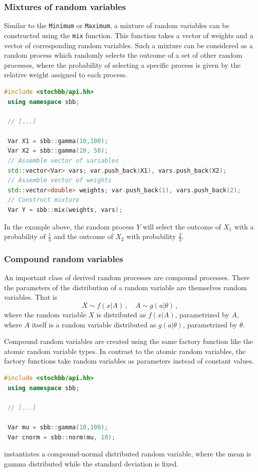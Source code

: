 \documentclass[a4paper, 10pt]{paper}
\newcommand{\code}[1]{\texttt{#1}}
\newcommand{\class}[1]{\code{#1}}
\newcommand{\function}[1]{\code{#1}}
\begin{document}
\subsubsection{Mixtures of random variables}
Similar to the \class{Minimum} or \class{Maximum}, a mixture of random variables can be
constructed using the \function{mix} function. This function takes a vector of weights and a vector
of corresponding random variables. Such a mixture can be considered as a random process which
randomly selects the outcome of a set of other random processes, where the probability of
selecting a specific process is given by the relative weight assigned to each process.
\begin{lstlisting}[language=C++]
 #include <stochbb/api.hh>
 using namespace sbb;

 // [...]

 Var X1 = sbb::gamma(10,100);
 Var X2 = sbb::gamma(20, 50);
 // Assemble vector of variables
 std::vector<Var> vars; var.push_back(X1), vars.push_back(X2);
 // Assemble vector of weights
 std::vector<double> weights; var.push_back(1), vars.push_back(2);
 // Construct mixture
 Var Y = sbb::mix(weights, vars);
\end{lstlisting}

In the example above, the random process $Y$ will select the outcome of $X_1$ with
a probability of $\frac{1}{3}$ and the outcome of $X_2$ with probability
$\frac{2}{3}$.

\subsubsection{Compound random variables}
An important class of derived random processes are compound processes. There the parameters of the
distribution of a random variable are themselves random variables. That is
\begin{equation}
 X \sim f(x|A)\,,\quad A \sim g(a|\theta)\,, \nonumber
\end{equation}
where the random variable $X$ is distributed as $f(x|A)$, parametrized by $A$,
where $A$ itself is a random variable distributed as $g(a|\theta)$, parametrized by
$\theta$. 

Compound random variables are created using the same factory function like the atomic random variable
types. In contrast to the atomic random variables, the factory functions take random variables as 
parameters instead of constant values.
\begin{lstlisting}[language=C++]
 #include <stochbb/api.hh>
 using namespace sbb;
 
 // [...]
 
 Var mu = sbb::gamma(10,100);
 Var cnorm = sbb::norm(mu, 10);
\end{lstlisting}
instantiates a compound-normal distributed random variable, where the mean is gamma distributed
while the standard deviation is fixed.
\end{document}

